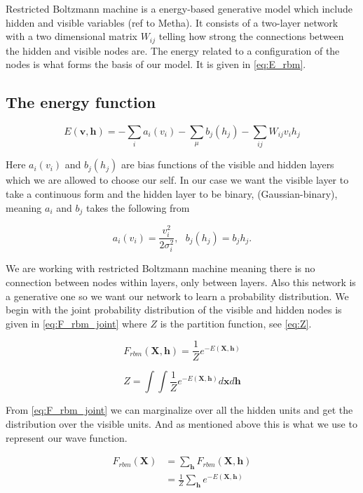 Restricted Boltzmann machine is a energy-based generative model which include hidden and visible variables (ref to Metha). It consists of a two-layer network with a two dimensional matrix $W_{ij}$ telling how strong the connections between the hidden and visible nodes are. The energy related to a configuration of the nodes is what forms the basis of our model. It is given in \eqref{eq:E_rbm}.

\subsection{The energy function}
\begin{equation}\label{eq:E_rbm}
E(\mathbf{v}, \mathbf{h}) = - \sum_{i} a_i(v_i) - \sum_{\mu} b_j(h_j) - \sum_{ij} W_{ij}v_i h_j 
\end{equation}

Here $a_i(v_i)$ and $b_j(h_j)$ are bias functions of the visible and hidden layers which we are allowed to choose our self. In our case we want the visible layer to take a continuous form and the hidden layer to be binary, (Gaussian-binary), meaning $a_i$ and $b_j$ takes the following from

$$a_i(v_i) = \frac{v_i^2}{2 \sigma_i^2}, \ \ \ b_j(h_j)= b_jh_j.$$

We are working with restricted Boltzmann machine meaning there is no connection between nodes within layers, only between layers. Also this network is a generative one so we want our network to learn a probability distribution. We begin with the joint probability distribution of the visible and hidden nodes is given in \eqref{eq:F_rbm_joint} where $Z$ is the partition function, see \eqref{eq:Z}. 

\begin{equation}\label{eq:F_rbm_joint}
F_{rbm} (\mathbf{X}, \mathbf{h}) = \frac{1}{Z} e^{-E(\mathbf{X}, \mathbf{h})}
\end{equation}

\begin{equation}\label{eq:Z}
Z = \int \int \frac{1}{Z} e^{-E(\mathbf{X}, \mathbf{h})} d\mathbf{x}d\mathbf{h}
\end{equation}

From \eqref{eq:F_rbm_joint} we can marginalize over all the hidden units and get the distribution over the visible units. And as mentioned above this is what we use to represent our wave function. 

\begin{align}\label{eq:F_rbm_marg}
F_{rbm} (\mathbf{X}) &= \sum_{\mathbf{h}} F_{rbm} (\mathbf{X}, \mathbf{h}) \\
&= \frac{1}{Z} \sum_{\mathbf{h}} e^{-E(\mathbf{X}, \mathbf{h})}
\end{align}

